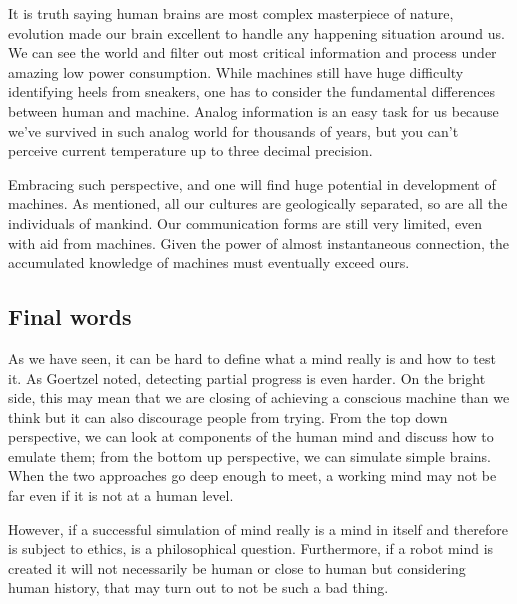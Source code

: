 \documentclass[11pt]{article}
\newenvironment{draft}{\color{dark-cornflower-blue-2}}{\ignorespacesafterend}
\begin{document}
It is truth saying human brains are most complex masterpiece of nature, evolution made our brain excellent to handle any happening situation around us. We can see the world and filter out most critical information and process under amazing low power consumption. While machines still have huge difficulty identifying heels from sneakers, one has to consider the fundamental differences between human and machine. Analog information is an easy task for us because we've survived in such analog world for thousands of years, but you can't perceive current temperature up to three decimal precision.

Embracing such perspective, and one will find huge potential in development of machines. As mentioned, all our cultures are geologically separated, so are all the individuals of mankind. Our communication forms are still very limited, even with aid from machines. Given the power of almost instantaneous connection, the accumulated knowledge of machines must eventually exceed ours.

\subsection{Final words}
\begin{draft}

As we have seen, it can be hard to define what a mind really is and how to test it. As Goertzel noted, detecting partial progress is even harder. On the bright side, this may mean that we are closing of achieving a conscious machine than we think but it can also discourage people from trying. From the top down perspective, we can look at components of the human mind and discuss how to emulate them; from the bottom up perspective, we can simulate simple brains. When the two approaches go deep enough to meet, a working mind may not be far even if it is not at a human level.

However, if a successful simulation of mind really is a mind in itself and therefore is subject to ethics, is a philosophical question. Furthermore, if a robot mind is created it will not necessarily be human or close to human but considering human history, that may turn out to not be such a bad thing.

\end{draft}





\end{document}
